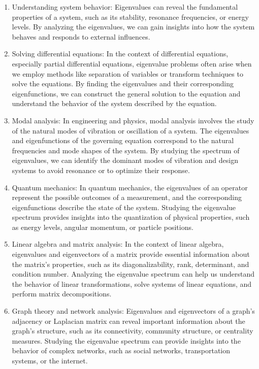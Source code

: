 \documentclass[
]{article}
\begin{document}
\begin{enumerate}
\def\labelenumi{\arabic{enumi}.}
\item
  Understanding system behavior: Eigenvalues can reveal the fundamental
  properties of a system, such as its stability, resonance frequencies,
  or energy levels. By analyzing the eigenvalues, we can gain insights
  into how the system behaves and responds to external influences.
\item
  Solving differential equations: In the context of differential
  equations, especially partial differential equations, eigenvalue
  problems often arise when we employ methods like separation of
  variables or transform techniques to solve the equations. By finding
  the eigenvalues and their corresponding eigenfunctions, we can
  construct the general solution to the equation and understand the
  behavior of the system described by the equation.
\item
  Modal analysis: In engineering and physics, modal analysis involves
  the study of the natural modes of vibration or oscillation of a
  system. The eigenvalues and eigenfunctions of the governing equation
  correspond to the natural frequencies and mode shapes of the system.
  By studying the spectrum of eigenvalues, we can identify the dominant
  modes of vibration and design systems to avoid resonance or to
  optimize their response.
\item
  Quantum mechanics: In quantum mechanics, the eigenvalues of an
  operator represent the possible outcomes of a measurement, and the
  corresponding eigenfunctions describe the state of the system.
  Studying the eigenvalue spectrum provides insights into the
  quantization of physical properties, such as energy levels, angular
  momentum, or particle positions.
\item
  Linear algebra and matrix analysis: In the context of linear algebra,
  eigenvalues and eigenvectors of a matrix provide essential information
  about the matrix's properties, such as its diagonalizability, rank,
  determinant, and condition number. Analyzing the eigenvalue spectrum
  can help us understand the behavior of linear transformations, solve
  systems of linear equations, and perform matrix decompositions.
\item
  Graph theory and network analysis: Eigenvalues and eigenvectors of a
  graph's adjacency or Laplacian matrix can reveal important information
  about the graph's structure, such as its connectivity, community
  structure, or centrality measures. Studying the eigenvalue spectrum
  can provide insights into the behavior of complex networks, such as
  social networks, transportation systems, or the internet.
\end{enumerate}
\end{document}
